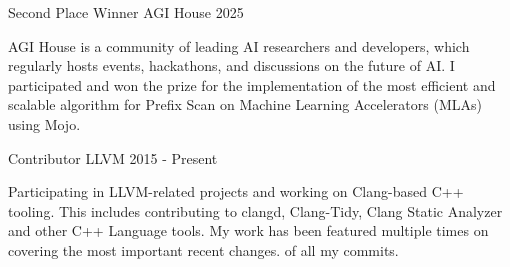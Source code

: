 
\begin{cventries}

  \cventry
    {Second Place Winner}
    {AGI House}
    {}
    {2025}
    {
      \begin{cvitems}
        AGI House is a community of leading AI researchers and developers,
        which regularly hosts events, hackathons, and discussions on the
        future of AI. I participated and won the prize for the implementation
        of the most efficient and scalable algorithm for Prefix Scan on
        Machine Learning Accelerators (MLAs) using Mojo.
      \end{cvitems}
    }

  \cventry
    {Contributor}
    {LLVM}
    {}
    {2015 - Present}
    {
      \begin{cvitems}
        Participating in LLVM-related projects and working on Clang-based C++
        tooling. This includes contributing to clangd, Clang-Tidy, Clang Static
        Analyzer and other C++ Language tools. My work has been featured
        multiple times on  covering
        the most important recent changes.
        of all my commits.
      \end{cvitems}
    }

\end{cventries}

